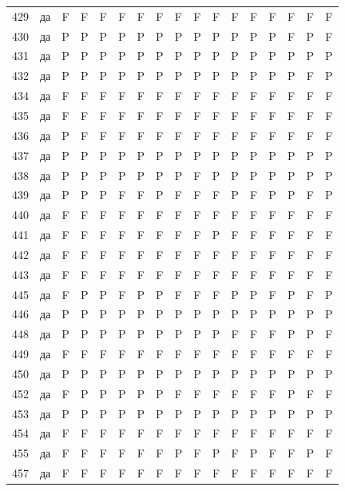 \begin{table}[p]
\begin{tabular*}{\textwidth}{@{\extracolsep{\fill}}rcccccccccccccccc}
429 & да & F & F & F & F & F & F & F & F & F & F & F & F & F & F & F\\
430 & да & P & P & P & P & P & P & P & P & P & P & P & P & F & P & F\\
431 & да & P & P & P & P & P & P & P & P & P & P & P & P & P & P & P\\
432 & да & P & P & P & P & P & P & P & P & P & P & P & P & P & F & P\\
434 & да & F & F & F & F & F & F & F & F & F & F & F & F & F & F & F\\
435 & да & F & F & F & F & F & F & F & F & F & F & F & F & F & F & F\\
436 & да & P & F & F & F & F & F & F & F & F & F & F & F & F & F & F\\
437 & да & P & P & P & P & P & P & P & P & P & P & P & P & P & P & P\\
438 & да & P & P & P & P & P & P & P & F & P & P & P & P & P & P & P\\
439 & да & P & P & P & F & F & P & F & F & F & P & F & P & P & F & P\\
440 & да & F & F & F & F & F & F & F & F & F & F & F & F & F & F & F\\
441 & да & F & F & F & F & F & F & F & F & P & F & F & F & F & F & F\\
442 & да & F & F & F & F & F & F & F & F & F & F & F & F & F & F & F\\
443 & да & F & F & F & F & F & F & F & F & F & F & F & F & F & F & F\\
445 & да & F & P & P & F & P & P & F & F & F & P & P & F & P & F & P\\
446 & да & P & P & P & P & P & P & P & P & P & P & P & P & P & P & P\\
448 & да & P & P & P & P & P & P & P & P & P & F & F & F & P & P & F\\
449 & да & F & F & F & F & F & F & F & F & F & F & F & F & F & F & F\\
450 & да & P & P & P & P & P & P & P & P & P & P & P & P & P & P & P\\
452 & да & F & P & P & P & P & P & F & F & F & F & F & F & P & F & F\\
453 & да & P & P & P & P & P & P & P & P & P & P & P & P & P & P & P\\
454 & да & F & F & F & F & F & F & F & F & F & F & F & F & F & F & F\\
455 & да & F & F & F & F & F & F & P & F & P & F & P & F & F & P & F\\
457 & да & F & F & F & F & F & F & F & F & F & F & F & F & F & F & F\\
\bottomrule\end{tabular*}\end{table}
\clearpage

